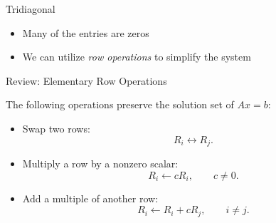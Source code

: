 \documentclass[10pt]{beamer}
\begin{document}

\begin{frame}{Tridiagonal}
\begin{itemize}
  \item Many of the entries are zeros 
  \item We can utilize \textit{row operations} to simplify the system
\end{itemize}
\end{frame}
\begin{frame}{Review: Elementary Row Operations}

The following operations preserve the solution set of $Ax=b$:

\begin{itemize}
    \item Swap two rows:
    \[
        R_i \leftrightarrow R_j.
    \]

    \item Multiply a row by a nonzero scalar:
    \[
        R_i \leftarrow cR_i, \qquad c\neq0.
    \]

    \item Add a multiple of another row:
    \[
        R_i \leftarrow R_i+cR_j, \qquad i\neq j.
    \]
\end{itemize}



\end{frame}
\end{document}
